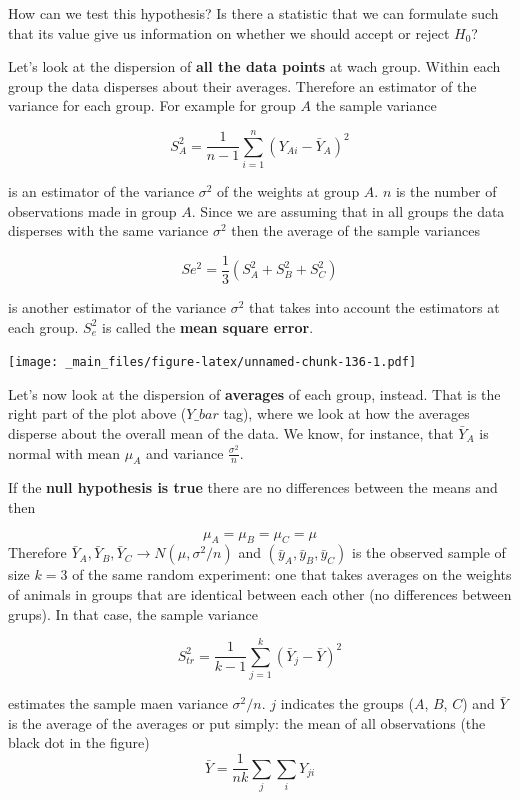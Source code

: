 \documentclass[
]{book}
\begin{document}
How can we test this hypothesis? Is there a statistic that we can formulate such that its value give us information on whether we should accept or reject \(H_0\)?

Let's look at the dispersion of \textbf{all the data points} at wach group.
Within each group the data disperses about their averages. Therefore an estimator of the variance for each group. For example for group \(A\) the sample variance

\[S_A^2=\frac{1}{n-1} \sum_{i=1}^n (Y_{Ai}-\bar{Y}_{A})^2\]

is an estimator of the variance \(\sigma^2\) of the weights at group \(A\). \(n\) is the number of observations made in group \(A\). Since we are assuming that in all groups the data disperses with the same variance \(\sigma^2\) then the average of the sample variances

\[Se^2 = \frac{1}{3}(S_A^2+S_B^2+S_C^2)\]

is another estimator of the variance \(\sigma^2\) that takes into account the estimators at each group. \(S_e^2\) is called the \textbf{mean square error}.

\texttt{[image: \_main\_files/figure-latex/unnamed-chunk-136-1.pdf]}

Let's now look at the dispersion of \textbf{averages} of each group, instead. That is the right part of the plot above (\(Y\_bar\) tag), where we look at how the averages disperse about the overall mean of the data. We know, for instance, that \(\bar{Y}_A\) is normal with mean \(\mu_A\) and variance \(\frac{\sigma^2}{n}\).

If the \textbf{null hypothesis is true} there are no differences between the means and then

\[\mu_A=\mu_B=\mu_C=\mu\]
Therefore \(\bar{Y}_A, \bar{Y}_B, \bar{Y}_C \rightarrow N(\mu, \sigma^2/n)\) and \((\bar{y}_A, \bar{y}_B, \bar{y}_C )\) is the observed sample of size \(k=3\) of the same random experiment: one that takes averages on the weights of animals in groups that are identical between each other (no differences between grups). In that case, the sample variance

\[S^2_{tr}=\frac{1}{k-1} \sum_{j=1}^k(\bar{Y}_{j}-\bar{Y})^2\]

estimates the sample maen variance \(\sigma^2/n\). \(j\) indicates the groups (\(A\), \(B\), \(C\)) and \(\bar{Y}\) is the average of the averages or put simply: the mean of all observations (the black dot in the figure) \[\bar{Y}=\frac{1}{nk}\sum_j \sum_i Y_{ji}\]
\end{document}
